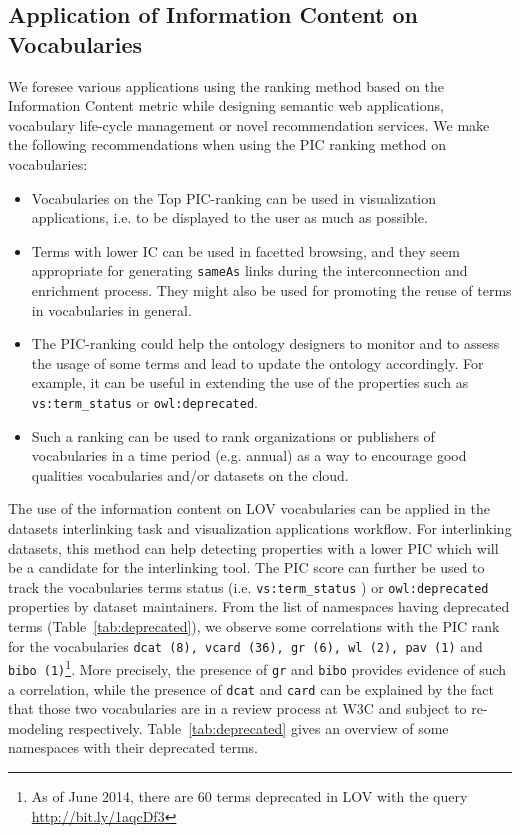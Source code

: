 \begin{description}
\subsection{Application of Information Content on Vocabularies}
\label{sec:application}
We foresee various applications using the ranking method based on the Information Content metric while designing semantic web applications, vocabulary life-cycle management or novel recommendation services. We make the following recommendations when using the PIC ranking method on vocabularies:
\begin{itemize}
 \item Vocabularies on the Top PIC-ranking can be used in visualization applications, i.e. to be displayed to the user as much as possible.
 \item Terms with lower IC can be used in facetted browsing, and they seem appropriate for generating \texttt{sameAs} links during the interconnection and enrichment process. They might also be used for promoting the reuse of terms in vocabularies in general.
 \item The PIC-ranking could help the ontology designers to monitor and to assess the usage of some terms and lead to update the ontology accordingly. For example, it can be useful in extending the use of the properties such as \texttt{vs:term\_status} or \texttt{owl:deprecated}.
 \item Such a ranking can be used to rank organizations or publishers of vocabularies in a time period (e.g. annual) as a way to encourage good qualities vocabularies and/or datasets on the cloud.
\end{itemize}
The use of the information content on LOV vocabularies can be applied in the datasets interlinking task and visualization applications workflow. For interlinking datasets, this method can help detecting properties with a lower PIC which will be a candidate for the interlinking tool. The PIC score can further be used to track the vocabularies terms status (i.e. \texttt{vs:term\_status} ) or \texttt{owl:deprecated} properties by dataset maintainers. From the list of namespaces having deprecated terms (Table~\ref{tab:deprecated}), we observe some correlations with the PIC rank for the vocabularies \texttt{dcat (8), vcard (36), gr (6), wl (2), pav (1)} and \texttt{bibo (1)}\footnote{As of June 2014, there are 60 terms deprecated in LOV with the query \url{http://bit.ly/1aqcDf3}}. More precisely, the presence of \texttt{gr} and \texttt{bibo} provides evidence of such a correlation, while the presence of \texttt{dcat} and \texttt{card} can be explained by the fact that those two vocabularies are in a review process at W3C and subject to re-modeling respectively. Table~\ref{tab:deprecated} gives an overview of some namespaces with their deprecated terms.




\end{description}
